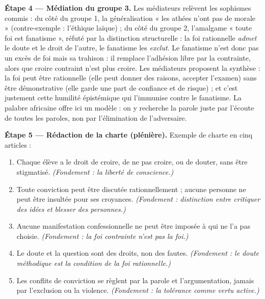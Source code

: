 \documentclass[11pt]{article}
\newcounter{popsec}
\newcounter{popsub}
\newcommand{\courssub}[1]{%
  \stepcounter{popsub}%
  \par\vspace{9pt}\noindent{\popxbold\fontsize{11.5}{13}\selectfont\color{popink}{\color{poporange}\thepopsec.\thepopsub}\hspace{6pt}#1}\par\nopagebreak\vspace{4pt}
}
\begin{document}
\begin{exoresolu}
\textbf{Étape 4 — Médiation du groupe 3.} Les médiateurs relèvent les sophismes commis : du côté du groupe 1, la généralisation « les athées n'ont pas de morale » (contre-exemple : l'éthique laïque) ; du côté du groupe 2, l'amalgame « toute foi est fanatisme », réfuté par la distinction structurelle : la foi rationnelle \emph{admet} le doute et le droit de l'autre, le fanatisme les \emph{exclut}. Le fanatisme n'est donc pas un excès de foi mais sa trahison : il remplace l'adhésion libre par la contrainte, alors que croire contraint n'est plus croire. Les médiateurs proposent la synthèse : la foi peut être rationnelle (elle peut donner des raisons, accepter l'examen) sans être démonstrative (elle garde une part de confiance et de risque) ; et c'est justement cette humilité épistémique qui l'immunise contre le fanatisme. La palabre africaine offre ici un modèle : on y recherche la parole juste par l'écoute de toutes les paroles, non par l'élimination de l'adversaire.

\textbf{Étape 5 — Rédaction de la charte (plénière).} Exemple de charte en cinq articles :
\begin{enumerate}
  \item Chaque élève a le droit de croire, de ne pas croire, ou de douter, sans être stigmatisé. \emph{(Fondement : la liberté de conscience.)}
  \item Toute conviction peut être discutée rationnellement ; aucune personne ne peut être insultée pour ses croyances. \emph{(Fondement : distinction entre critiquer des idées et blesser des personnes.)}
  \item Aucune manifestation confessionnelle ne peut être imposée à qui ne l'a pas choisie. \emph{(Fondement : la foi contrainte n'est pas la foi.)}
  \item Le doute et la question sont des droits, non des fautes. \emph{(Fondement : le doute méthodique est la condition de la foi rationnelle.)}
  \item Les conflits de conviction se règlent par la parole et l'argumentation, jamais par l'exclusion ou la violence. \emph{(Fondement : la tolérance comme vertu active.)}
\end{enumerate}
\end{exoresolu}

\courssub{Bilan de l'activité}
\end{document}
